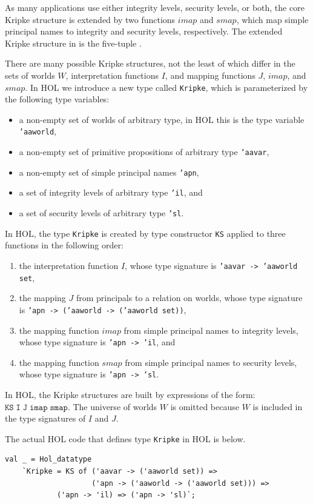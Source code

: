 As many applications use either integrity levels, security levels, or
both, the core Kripke structure is extended by two functions $imap$
and $smap$, which map simple principal names to integrity and security
levels, respectively. The extended Kripke structure in \cite{ACST} is
the five-tuple .

There are many possible Kripke structures, not the least of which
differ in the sets of worlds $W$, interpretation functions $I$, and
mapping functions $J$, $imap$, and $smap$. In HOL we introduce a new
type called \texttt{Kripke}, which is parameterized by the following
type variables:
\begin{itemize}
\item a non-empty set of worlds of arbitrary type, in HOL this is the
  type variable \texttt{'aaworld},
\item a non-empty set of primitive propositions of arbitrary type
  \texttt{'aavar},
\item a non-empty set of simple principal names \texttt{'apn},
\item a set of integrity levels of arbitrary type \texttt{'il}, and
\item a set of security levels of arbitrary type \texttt{'sl}.
\end{itemize}

In HOL, the type \texttt{Kripke} is created by type constructor
\texttt{KS} applied to three functions in the following order:
\begin{enumerate}
\item the interpretation function $I$, whose type signature is
  \texttt{'aavar -> 'aaworld set},
\item the mapping $J$ from principals to a relation on worlds, whose
  type signature is \texttt{'apn -> ('aaworld -> ('aaworld set))},
\item the mapping function $imap$ from simple principal names to
  integrity levels, whose type signature is \texttt{'apn -> 'il}, and
\item the mapping function $smap$ from simple principal names to
  security levels, whose type signature is \texttt{'apn -> 'sl}.
\end{enumerate}
In HOL, the Kripke structures are built by expressions of the form:
$\mathtt{KS\; I\; J\; imap\; smap}$. The universe of worlds $W$ is
omitted because $W$ is included in the type signatures of $I$ and $J$.

The actual HOL code that defines type \texttt{Kripke} in HOL is below.
\begin{session}
\begin{verbatim}
val _ = Hol_datatype 
    `Kripke = KS of ('aavar -> ('aaworld set)) =>
    	      	    ('apn -> ('aaworld -> ('aaworld set))) =>
		    ('apn -> 'il) => ('apn -> 'sl)`;
\end{verbatim}
\end{session}

